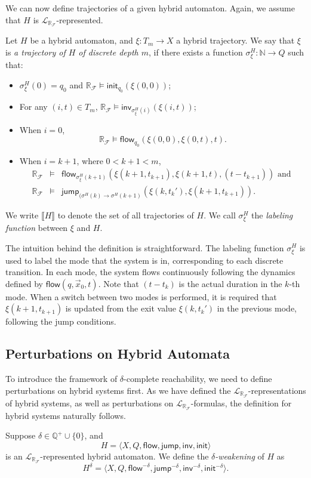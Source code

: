 \documentclass[envcountsect]{llncs}
\newcommand{\flow}{\mathsf{flow}}
\newcommand{\jump}{\mathsf{jump}}
\newcommand{\inv}{\mathsf{inv}}
\newcommand{\init}{\mathsf{init}}
\newcommand{\lrf}{\mathcal{L}_{\mathbb{R}_{\mathcal{F}}}}
\begin{document}
We can now define trajectories of a given hybrid automaton. Again, we assume
that $H$ is $\lrf$-represented.
\begin{definition}\label{trajec}
Let $H$ be a hybrid automaton, and $\xi: T_m\rightarrow X$ a hybrid trajectory.
We say that $\xi$ is {\em a trajectory of $H$ of discrete depth $m$}, if there
exists a function $\sigma^H_{\xi}: \mathbb{N}\rightarrow Q$ such
that:
\begin{itemize}
\item $\sigma^H_{\xi}(0) = q_0$ and
$\mathbb{R}_{\mathcal{F}}\models \init_{q_0}(\xi(0,0))$;
\item For any $(i, t)\in T_m$,
$\mathbb{R}_{\mathcal{F}}\models \inv_{\sigma^H_{\xi}(i)} (\xi(i,t))$;
\item When $i=0$,
$$\mathbb{R}_{\mathcal{F}}\models\flow_{q_0}(\xi(0,0), \xi(0,t), t).$$
\item When $i = k+1$, where $0< k+1 <m$,
\begin{eqnarray*}
\mathbb{R}_{\mathcal{F}}&\models&\flow_{\sigma^H_{\xi}(k+1)}(\xi(k+1, t_{k+1}),
\xi(k+1, t), (t - t_{k+1}))\mbox{ and }\\
\mathbb{R}_{\mathcal{F}}&\models& \jump_{(\sigma^H(k)\rightarrow
\sigma^H(k+1)}(\xi(k, t_k'), \xi(k+1,t_{k+1})).
\end{eqnarray*}
\end{itemize}
We write $\llbracket H\rrbracket$ to denote the set of all trajectories of $H$.
We call $\sigma^H_{\xi}$ the {\em labeling function} between $\xi$ and $H$.
\end{definition}
\begin{remark}
The intuition behind the definition is straightforward. The
labeling function
$\sigma_{\xi}^H$ is used to label the mode that the system is in, corresponding
to each discrete transition. In each mode, the system flows continuously
following the dynamics defined by $\flow(q, \vec x_0, t)$. Note that $(t-t_k)$
is the actual duration in the $k$-th mode. When a switch between two modes is
performed, it is required that $\xi(k+1, t_{k+1})$ is updated from the exit
value $\xi(k, t_k')$ in the previous mode, following the jump conditions.
\end{remark}

\subsection{Perturbations on Hybrid Automata}
To introduce the framework of $\delta$-complete reachability, we need to
define perturbations on hybrid systems first. As we have defined the
$\lrf$-representations of hybrid systems, as well as perturbations on
$\lrf$-formulas, the definition for hybrid systems naturally follows.
\begin{definition}
Suppose $\delta\in\mathbb{Q}^+\cup\{0\}$, and
$$H = \langle X, Q, \flow, \jump, \inv, \init\rangle$$
is an $\lrf$-represented hybrid automaton. We define the {\em
$\delta$-weakening} of $H$ as
$$H^{\delta} = \langle X, Q, \flow^{-\delta}, \jump^{-\delta}, \inv^{-\delta},
\init^{-\delta}\rangle.$$
\end{definition}
\end{document}
